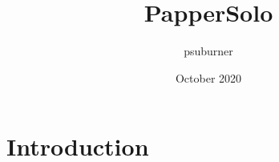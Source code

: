 \documentclass{article}
\title{PapperSolo}
\author{psuburner }
\date{October 2020}
\begin{document}
\maketitle

\section{Introduction}
\end{document}
